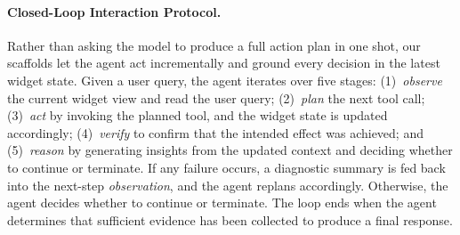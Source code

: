 \paragraph{Closed-Loop Interaction Protocol.}
Rather than asking the model to produce a full action plan in one shot, our scaffolds let the agent act incrementally and ground every decision in the latest widget state.
Given a user query, the agent iterates over five stages:
(1)~\emph{observe} the current widget view and read the user query;
(2)~\emph{plan} the next tool call;
(3)~\emph{act} by invoking the planned tool, and the widget state is updated accordingly;
(4)~\emph{verify} to confirm that the intended effect was achieved; and
(5)~\emph{reason} by generating insights from the updated context and deciding whether to continue or terminate.
If any failure occurs, a diagnostic summary is fed back into the next-step \textit{observation}, and the agent replans accordingly.
Otherwise, the agent decides whether to continue or terminate.
The loop ends when the agent determines that sufficient evidence has been collected to produce a final response.



